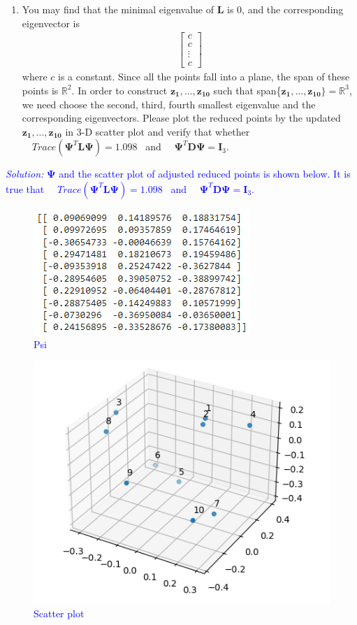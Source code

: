 \documentclass{article}
\def\solColor{blue}
\begin{document}
\begin{enumerate}[resume]
\item You may find that the minimal eigenvalue of $\boldsymbol{L}$ is 0, and the corresponding eigenvector is 
\begin{align}
    \begin{bmatrix}
       c \\
       c \\
       \vdots \\
       c
     \end{bmatrix}
  \end{align}
  where $c$ is a constant. Since all the points fall into a plane, the span of these points is $\mathbb{R}^2$. In order to construct $\boldsymbol{z_1},...,\boldsymbol{z_{10}}$ such that span\{$\boldsymbol{z_1},...,\boldsymbol{z_{10}}\}=\mathbb{R}^3$, we need choose the second, third, fourth smallest eigenvalue and the corresponding eigenvectors. Please plot the reduced points by the updated $\boldsymbol{z_1},...,\boldsymbol{z_{10}}$ in 3-D scatter plot and verify that whether 
$\quad Trace(\boldsymbol{\Psi}^T \boldsymbol{L} \boldsymbol{\Psi})=1.098$ \ and $\quad \boldsymbol{\Psi}^T \boldsymbol{D} \boldsymbol{\Psi} = \boldsymbol{I}_3$.

\end{enumerate}

\textcolor{\solColor}{\textit{Solution:}
$\boldsymbol{\Psi}$ and the scatter plot of adjusted reduced points is shown below. It is true that $\quad Trace(\boldsymbol{\Psi}^T \boldsymbol{L} \boldsymbol{\Psi})=1.098$ \ and $\quad \boldsymbol{\Psi}^T \boldsymbol{D} \boldsymbol{\Psi} = \boldsymbol{I}_3$.
	\begin{figure}[H]
	\centerline{\includegraphics[width = 5 cm, height = 5 cm]{sol 2-4 Psi.png}}
	\label{fig:sol 2-4 Psi}
  \caption{
	Psi
	}
	\end{figure}
	\begin{figure}[H]
	\centerline{\includegraphics[width = 5 cm, height = 5 cm]{sol 2-4.png}}
	\label{fig:sol 2-4}
  \caption{
	Scatter plot
	}
	\end{figure}
}
\end{document}

